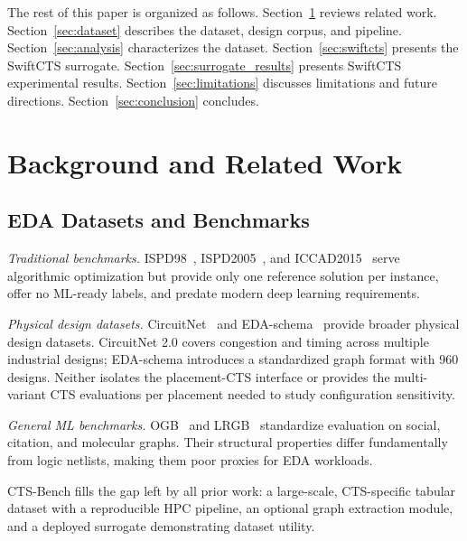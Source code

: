 \documentclass[acmsmall,review,anonymous]{acmart}
\begin{document}
The rest of this paper is organized as follows.
Section~\ref{sec:related} reviews related work.
Section~\ref{sec:dataset} describes the dataset, design corpus, and pipeline.
Section~\ref{sec:analysis} characterizes the dataset.
Section~\ref{sec:swiftcts} presents the SwiftCTS surrogate.
Section~\ref{sec:surrogate_results} presents SwiftCTS experimental results.
Section~\ref{sec:limitations} discusses limitations and future directions.
Section~\ref{sec:conclusion} concludes.

\section{Background and Related Work}
\label{sec:related}

\subsection{EDA Datasets and Benchmarks}

\textit{Traditional benchmarks.}
ISPD98~\cite{10.1145/274535.274546}, ISPD2005~\cite{10.1145/1055137.1055182},
and ICCAD2015~\cite{7372671} serve algorithmic optimization but provide only
one reference solution per instance, offer no ML-ready labels, and predate
modern deep learning requirements.

\textit{Physical design datasets.}
CircuitNet~\cite{jiang2024circuitnet} and
EDA-schema~\cite{10.1145/3649476.3658718} provide broader physical design
datasets. CircuitNet 2.0 covers congestion and timing across multiple
industrial designs; EDA-schema introduces a standardized graph format with
960 designs. Neither isolates the placement-CTS interface or provides the
multi-variant CTS evaluations per placement needed to study configuration
sensitivity.

\textit{General ML benchmarks.}
OGB~\cite{hu2021opengraphbenchmarkdatasets} and
LRGB~\cite{dwivedi2023longrangegraphbenchmark} standardize evaluation on
social, citation, and molecular graphs. Their structural properties differ
fundamentally from logic netlists, making them poor proxies for EDA workloads.

\noindent
CTS-Bench fills the gap left by all prior work: a large-scale,
CTS-specific tabular dataset with a reproducible HPC pipeline, an optional
graph extraction module, and a deployed surrogate demonstrating dataset utility.
\end{document}

